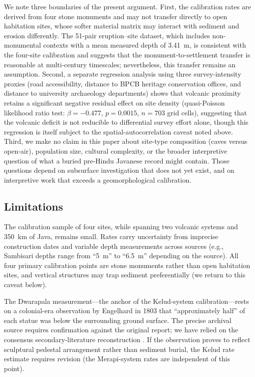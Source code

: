 \documentclass[12pt,a4paper]{article}
\begin{document}
We note three boundaries of the present argument. First, the calibration rates are derived from four stone monuments and may not transfer directly to open habitation sites, whose softer material matrix may interact with sediment and erosion differently. The 51-pair eruption--site dataset, which includes non-monumental contexts with a mean measured depth of 3.41~m, is consistent with the four-site calibration and suggests that the monument-to-settlement transfer is reasonable at multi-century timescales; nevertheless, this transfer remains an assumption. Second, a separate regression analysis using three survey-intensity proxies (road accessibility, distance to BPCB heritage conservation offices, and distance to university archaeology departments) shows that volcanic proximity retains a significant negative residual effect on site density (quasi-Poisson likelihood ratio test: $\beta = -0.477$, $p = 0.0015$, $n = 703$ grid cells), suggesting that the volcanic deficit is not reducible to differential survey effort alone, though this regression is itself subject to the spatial-autocorrelation caveat noted above. Third, we make no claim in this paper about site-type composition (caves versus open-air), population size, cultural complexity, or the broader interpretive question of what a buried pre-Hindu Javanese record might contain. Those questions depend on subsurface investigation that does not yet exist, and on interpretive work that exceeds a geomorphological calibration.

\subsection{Limitations}

The calibration sample of four sites, while spanning two volcanic systems and 350~km of Java, remains small. Rates carry uncertainty from imprecise construction dates and variable depth measurements across sources (e.g., Sambisari depths range from ``5~m'' to ``6.5~m'' depending on the source). All four primary calibration points are stone monuments rather than open habitation sites, and vertical structures may trap sediment preferentially (we return to this caveat below).

The Dwarapala measurement---the anchor of the Kelud-system calibration---rests on a colonial-era observation by Engelhard in 1803 that ``approximately half'' of each statue was below the surrounding ground surface. The precise archival source requires confirmation against the original report; we have relied on the consensus secondary-literature reconstruction \citep{kinney2003}. If the observation proves to reflect sculptural pedestal arrangement rather than sediment burial, the Kelud rate estimate requires revision (the Merapi-system rates are independent of this point).
\end{document}
